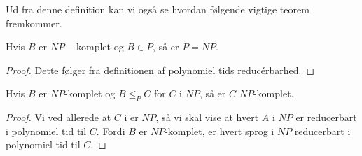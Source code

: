 Ud fra denne definition kan vi også se hvordan følgende vigtige teorem fremkommer.
\begin{theorem}
Hvis $B$ er $NP-$komplet og $B \in P$, så er $P = NP$.
\end{theorem}

\begin{proof}
Dette følger fra definitionen af polynomiel tids reducérbarhed.
\end{proof}

\begin{theorem}
Hvis $B$ er $NP$-komplet og $B \le_{P} C$ for $C$ i $NP$, så er $C$ $NP$-komplet.
\end{theorem}

\begin{proof}
Vi ved allerede at $C$ i er $NP$, så vi skal vise at hvert $A$ i $NP$ er reducerbart i polynomiel tid til $C$. Fordi $B$ er $NP$-komplet, er hvert sprog i $NP$ reducerbart i polynomiel tid til $C$.
\end{proof}






